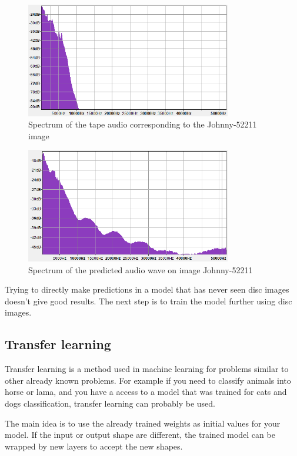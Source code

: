 \documentclass[12pt, twoside]{article}
\begin{document}
\begin{figure}
	\centering
	\includegraphics[width=0.8\textwidth]{../images/spectrum_tape.png}
	\caption{Spectrum of the tape audio corresponding to the Johnny-52211 image}
	\label{spectrum_tape}
\end{figure}

\begin{figure}
	\centering
	\includegraphics[width=0.8\textwidth]{../images/spectrum_m5000.png}
	\caption{Spectrum of the predicted audio wave on image Johnny-52211}
	\label{spectrum_m5000}
\end{figure}

Trying to directly make predictions in a model that has never seen disc images doesn't give good results. The next step is to train the model further using disc images.

\subsection{Transfer learning}
Transfer learning is a method used in machine learning for problems similar to other already known problems. For example if you need to classify animals into horse or lama, and you have a access to a model that was trained for cats and dogs classification, transfer learning can probably be used.

The main idea is to use the already trained weights as initial values for your model. If the input or output shape are different, the trained model can be wrapped by new layers to accept the new shapes.
\end{document}
